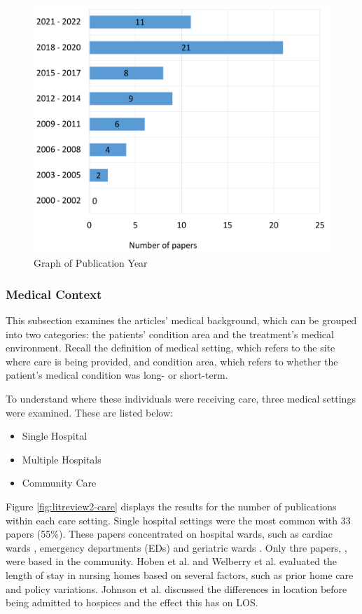 \documentclass[../thesis.tex]{subfiles}
\begin{document}
\begin{figure}[h!]
    \centering
    \includegraphics[scale = 0.5]{Chapters/Chapter2/Figures2/year1.pdf}
    \caption{Graph of Publication Year}
    \label{fig:litreview2-year}
\end{figure}

\subsubsection{Medical Context}
This subsection examines the articles' medical background, which can be grouped into two categories: the patients' condition area and the treatment's medical environment. Recall the definition of medical setting, which refers to the site where care is being provided, and condition area, which refers to whether the patient's medical condition was long- or short-term. 

To understand where these individuals were receiving care, three medical settings were examined. These are listed below:

\begin{itemize}
    \item Single Hospital
    \item Multiple Hospitals
    \item Community Care
\end{itemize}

Figure \ref{fig:litreview2-care} displays the results for the number of publications within each care setting. Single hospital settings were the most common with 33 papers (55\%). These papers concentrated on hospital wards, such as cardiac wards \cite{Cacciatore2012}, emergency departments (EDs) \cite{Bahrmann2018} and geriatric wards \cite{Tal2021}. Only thre papers, \cite{Hoben2019, Johnson2011, Welberry}, were based in the community. Hoben et al. \cite{Hoben2019} and Welberry et al. \cite{Welberry} evaluated the length of stay in nursing homes based on several factors, such as prior home care and policy variations. Johnson et al. \cite{Johnson2011} discussed the differences in location before being admitted to hospices and the effect this has on LOS. 
\end{document}
